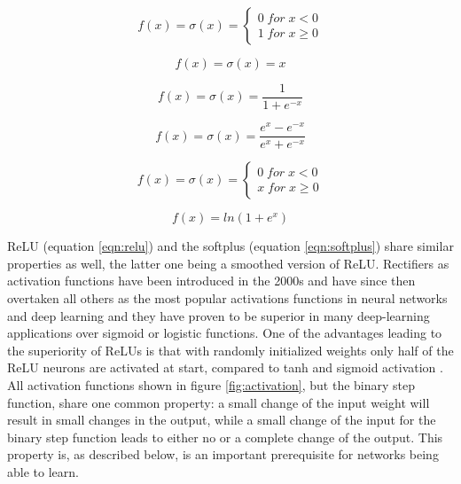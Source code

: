 \begin{equation}
 f(x)= \sigma(x) = \left\{
 \begin{array}{ll}
 0 \; for \; x < 0 \\ 
 1 \; for \; x \geq 0
 \end{array}
\right .
\label{eqn:binary}
\end{equation}

\begin{equation}
 f(x) = \sigma(x) = x
 \label{eqn:ident}
\end{equation}
    
\begin{equation}
 f(x) = \sigma(x) = \frac{1}{1+e^{-x}} 
 \label{eqn:sigmoid}
\end{equation}

\begin{equation}
 f(x) = \sigma(x) = \frac{e^x - e^{-x}}{e^x + e^{-x}}
 \label{eqn:tanh}
\end{equation}

\begin{equation}
 f(x)= \sigma(x) = \left\{
 \begin{array}{ll}
 0 \; for \; x < 0 \\ 
 x \; for \; x \geq 0
 \end{array}
\right .
\label{eqn:relu}
\end{equation}

\begin{equation}
 f(x) = ln(1+e^x)
 \label{eqn:softplus}
\end{equation}


ReLU (equation \ref{eqn:relu}) and the softplus (equation \ref{eqn:softplus}) share similar properties as
well, the latter one being a smoothed version of ReLU. Rectifiers as activation functions have been introduced
in the 2000s \cite{hahnloser2000digital} and have since then overtaken all others as the most popular activations
functions in neural networks and deep learning \cite{lecun2015deep} and they have proven to be superior
in many deep-learning applications over sigmoid or logistic functions. One of the advantages leading to the
superiority of ReLUs is that with randomly initialized weights only half of the ReLU neurons are activated at start,
compared to tanh and sigmoid activation \cite{glorot2011deep}. All activation functions shown in figure
\ref{fig:activation}, but the binary step function, share one common property: a small change of the input
weight will result in small changes in the output, while a small change of the input for the binary step
function leads to either no or a complete change of the output. This property is, as described below, is an
important prerequisite for networks being able to learn. \\

